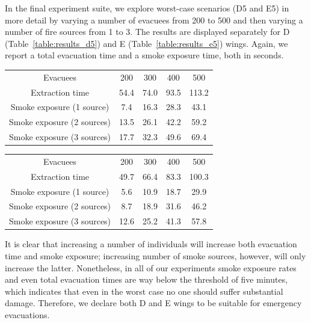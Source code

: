 In the final experiment suite, we explore worst-case scenarios (D5 and E5) in
more detail by varying a number of evacuees from 200 to 500 and then varying
a number of fire sources from 1 to 3.
The results are displayed separately for D (Table~\ref{table:results_d5})
and E (Table~\ref{table:results_e5}) wings.
Again, we report a total evacuation time and a smoke exposure time,
both in seconds.

\begin{center}
    \label{table:results_d5}
    \begin{tabular}{ c | c | c | c | c }
        \hline
        Evacuees & 200 & 300 & 400 & 500 \\
        Extraction time & 54.4 & 74.0 & 93.5 & 113.2 \\
        Smoke exposure (1 source) & 7.4 & 16.3 & 28.3 & 43.1 \\
        Smoke exposure (2 sources) & 13.5 & 26.1 & 42.2 & 59.2 \\
        Smoke exposure (3 sources) & 17.7 & 32.3 & 49.6 & 69.4 \\
        \hline
    \end{tabular}
\end{center}

\begin{center}
    \label{table:results_e5}
    \begin{tabular}{ c | c | c | c | c }
        \hline
        Evacuees & 200 & 300 & 400 & 500 \\
        Extraction time & 49.7 & 66.4 & 83.3 & 100.3 \\
        Smoke exposure (1 source) & 5.6 & 10.9 & 18.7 & 29.9 \\
        Smoke exposure (2 sources) & 8.7 & 18.9 & 31.6 & 46.2 \\
        Smoke exposure (3 sources) & 12.6 & 25.2 & 41.3 & 57.8 \\
        \hline
    \end{tabular}
\end{center}

It is clear that increasing a number of individuals will increase both
evacuation time and smoke exposure; increasing number of smoke sources, however,
will only increase the latter.
Nonetheless, in all of our experiments smoke exposure rates and even total
evacuation times are way below the threshold of five minutes, which indicates
that even in the worst case no one should suffer substantial damage.
Therefore, we declare both D and E wings to be suitable for emergency
evacuations.

